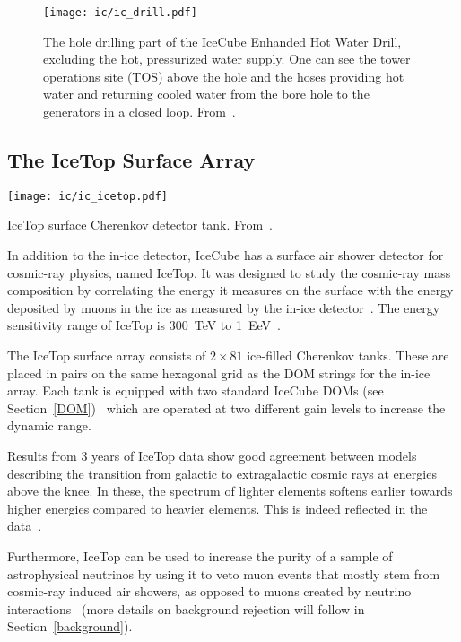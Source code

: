 \begin{figure}[]
    \texttt{[image: ic/ic\_drill.pdf]}
    \caption[IceCube enhanced hot water drill]{The hole drilling part of the IceCube Enhanded Hot Water Drill, excluding the hot, pressurized water supply. One can see the tower operations site (TOS) above the hole and the hoses providing hot water and returning cooled water from the bore hole to the generators in a closed loop. From~\cite{Benson2014}.}
\end{figure}

\subsection{The IceTop Surface Array}

\begin{marginfigure}
    \texttt{[image: ic/ic\_icetop.pdf]}
    \caption[IceTop detector]{IceTop surface Cherenkov detector tank. From~\cite{Abbasi2013}.}
\end{marginfigure}

In addition to the in-ice detector, IceCube has a surface air shower detector for cosmic-ray physics, named IceTop. It was designed to study the cosmic-ray mass composition by correlating the energy it measures on the surface with the energy deposited by muons in the ice as measured by the in-ice detector~. The energy sensitivity range of IceTop is \SI{300}{\tera\eV} to \SI{1}{\exa\eV}~.

The IceTop surface array consists of $2\times81$ ice-filled Cherenkov tanks. These are placed in pairs on the same hexagonal grid as the DOM strings for the in-ice array. Each tank is equipped with two standard IceCube DOMs (see Section~\ref{DOM})~\cite{Abbasi2013} which are operated at two different gain levels to increase the dynamic range.

Results from 3 years of IceTop data show good agreement between models describing the transition from galactic to extragalactic cosmic rays at energies above the knee. In these, the spectrum of lighter elements softens earlier towards higher energies compared to heavier elements. This is indeed reflected in the data~.

Furthermore, IceTop can be used to increase the purity of a sample of astrophysical neutrinos by using it to veto muon events that mostly stem from cosmic-ray induced air showers, as opposed to muons created by neutrino interactions~ (more details on background rejection will follow in Section~\ref{background}).

